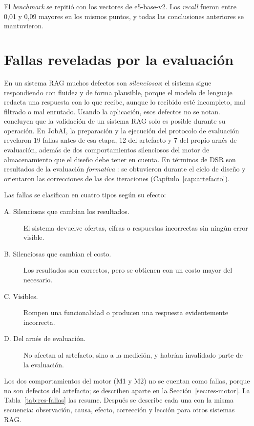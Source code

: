 El \textit{benchmark} se repitió con los vectores de e5-base-v2. Los \textit{recall} fueron entre 0,01 y 0,09 mayores en los mismos puntos, y todas las conclusiones anteriores se mantuvieron.

\section{Fallas reveladas por la evaluación}
\label{sec:res-fallas}

En un sistema RAG muchos defectos son \emph{silenciosos}: el sistema sigue respondiendo con fluidez y de forma plausible, porque el modelo de lenguaje redacta una respuesta con lo que recibe, aunque lo recibido esté incompleto, mal filtrado o mal enrutado. Usando la aplicación, esos defectos no se notan. \citet{Barnett2024} concluyen que la validación de un sistema RAG solo es posible durante su operación. En JobAI, la preparación y la ejecución del protocolo de evaluación revelaron 19 fallas antes de esa etapa, 12 del artefacto y 7 del propio arnés de evaluación, además de dos comportamientos silenciosos del motor de almacenamiento que el diseño debe tener en cuenta. En términos de DSR son resultados de la evaluación \emph{formativa} \citep{Venable2016}: se obtuvieron durante el ciclo de diseño y orientaron las correcciones de las dos iteraciones (Capítulo~\ref{cap:artefacto}).

Las fallas se clasifican en cuatro tipos según su efecto:
\begin{description}
    \item[A. Silenciosas que cambian los resultados.] El sistema devuelve ofertas, cifras o respuestas incorrectas sin ningún error visible.
    \item[B. Silenciosas que cambian el costo.] Los resultados son correctos, pero se obtienen con un costo mayor del necesario.
    \item[C. Visibles.] Rompen una funcionalidad o producen una respuesta evidentemente incorrecta.
    \item[D. Del arnés de evaluación.] No afectan al artefacto, sino a la medición, y habrían invalidado parte de la evaluación.
\end{description}
Los dos comportamientos del motor (M1 y M2) no se cuentan como fallas, porque no son defectos del artefacto; se describen aparte en la Sección~\ref{sec:res-motor}. La Tabla~\ref{tab:res-fallas} las resume. Después se describe cada una con la misma secuencia: observación, causa, efecto, corrección y lección para otros sistemas RAG.

